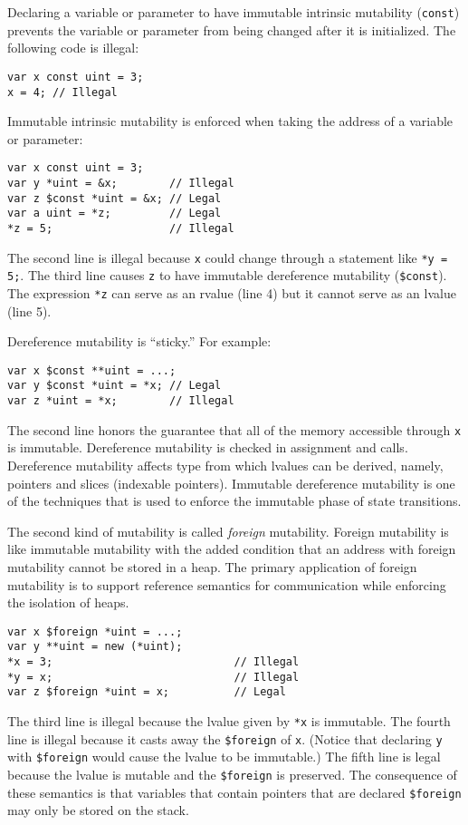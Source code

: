 Declaring a variable or parameter to have immutable intrinsic mutability (\verb+const+) prevents the variable or parameter from being changed after it is initialized.
The following code is illegal:
\begin{verbatim}
var x const uint = 3;
x = 4; // Illegal
\end{verbatim}
Immutable intrinsic mutability is enforced when taking the address of a variable or parameter:
\begin{verbatim}
var x const uint = 3;
var y *uint = &x;        // Illegal
var z $const *uint = &x; // Legal
var a uint = *z;         // Legal
*z = 5;                  // Illegal
\end{verbatim}
The second line is illegal because \verb+x+ could change through a statement like \verb+*y = 5;+.
The third line causes \verb+z+ to have immutable dereference mutability (\verb|$const|).
The expression \verb+*z+ can serve as an rvalue (line 4) but it cannot serve as an lvalue (line 5).

Dereference mutability is ``sticky.''
For example:
\begin{verbatim}
var x $const **uint = ...;
var y $const *uint = *x; // Legal
var z *uint = *x;        // Illegal
\end{verbatim}
The second line honors the guarantee that all of the memory accessible through \verb+x+ is immutable.
Dereference mutability is checked in assignment and calls.
Dereference mutability affects type from which lvalues can be derived, namely, pointers and slices (indexable pointers).
Immutable dereference mutability is one of the techniques that is used to enforce the immutable phase of state transitions.

The second kind of mutability is called \emph{foreign} mutability.
Foreign mutability is like immutable mutability with the added condition that an address with foreign mutability cannot be stored in a heap.
The primary application of foreign mutability is to support reference semantics for communication while enforcing the isolation of heaps.
\begin{verbatim}
var x $foreign *uint = ...;
var y **uint = new (*uint);
*x = 3;                            // Illegal
*y = x;                            // Illegal
var z $foreign *uint = x;          // Legal
\end{verbatim}
The third line is illegal because the lvalue given by \verb+*x+ is immutable.
The fourth line is illegal because it casts away the \verb|$foreign| of \verb+x+.
(Notice that declaring \verb+y+ with \verb|$foreign| would cause the lvalue to be immutable.)
The fifth line is legal because the lvalue is mutable and the \verb|$foreign| is preserved.
The consequence of these semantics is that variables that contain pointers that are declared \verb|$foreign| may only be stored on the stack.

